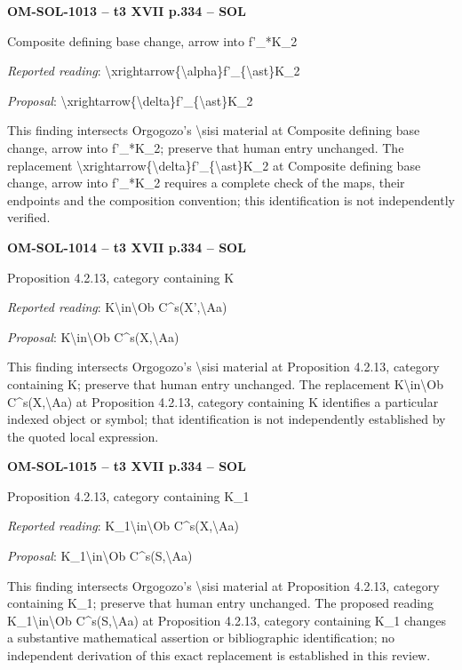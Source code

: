 \par\noindent\textbf{OM-SOL-1013 -- t3 XVII p.334 -- SOL}\par
Composite defining base change, arrow into f'\_*K\_2\par
\emph{Reported reading}: \textbackslash{}xrightarrow\{\textbackslash{}alpha\}f'\_\{\textbackslash{}ast\}K\_2\par
\emph{Proposal}: \textbackslash{}xrightarrow\{\textbackslash{}delta\}f'\_\{\textbackslash{}ast\}K\_2\par
This finding intersects Orgogozo's \textbackslash{}sisi material at Composite defining base change, arrow into f'\_*K\_2; preserve that human entry unchanged. The replacement \textbackslash{}xrightarrow\{\textbackslash{}delta\}f'\_\{\textbackslash{}ast\}K\_2 at Composite defining base change, arrow into f'\_*K\_2 requires a complete check of the maps, their endpoints and the composition convention; this identification is not independently verified.\par
\par\noindent\textbf{OM-SOL-1014 -- t3 XVII p.334 -- SOL}\par
Proposition 4.2.13, category containing K\par
\emph{Reported reading}: K\textbackslash{}in\textbackslash{}Ob C\textasciicircum{}s(X',\textbackslash{}Aa)\par
\emph{Proposal}: K\textbackslash{}in\textbackslash{}Ob C\textasciicircum{}s(X,\textbackslash{}Aa)\par
This finding intersects Orgogozo's \textbackslash{}sisi material at Proposition 4.2.13, category containing K; preserve that human entry unchanged. The replacement K\textbackslash{}in\textbackslash{}Ob C\textasciicircum{}s(X,\textbackslash{}Aa) at Proposition 4.2.13, category containing K identifies a particular indexed object or symbol; that identification is not independently established by the quoted local expression.\par
\par\noindent\textbf{OM-SOL-1015 -- t3 XVII p.334 -- SOL}\par
Proposition 4.2.13, category containing K\_1\par
\emph{Reported reading}: K\_1\textbackslash{}in\textbackslash{}Ob C\textasciicircum{}s(X,\textbackslash{}Aa)\par
\emph{Proposal}: K\_1\textbackslash{}in\textbackslash{}Ob C\textasciicircum{}s(S,\textbackslash{}Aa)\par
This finding intersects Orgogozo's \textbackslash{}sisi material at Proposition 4.2.13, category containing K\_1; preserve that human entry unchanged. The proposed reading K\_1\textbackslash{}in\textbackslash{}Ob C\textasciicircum{}s(S,\textbackslash{}Aa) at Proposition 4.2.13, category containing K\_1 changes a substantive mathematical assertion or bibliographic identification; no independent derivation of this exact replacement is established in this review.\par

